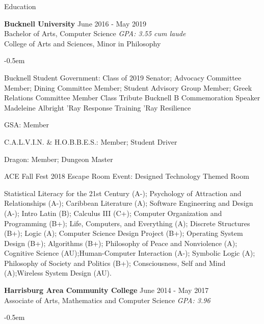\documentclass{resume} %
\begin{document}

\begin{rSection}{Education}

{\bf Bucknell University} {June 2016 - May 2019} 
\\ Bachelor of Arts, Computer Science  {\em GPA: 3.55 cum laude}
\\ College of Arts and Sciences, Minor in Philosophy 
\begin{rSubSection}{}{
   \itemsep -0.5em \vspace{-0.5em} %
 
    \item {Bucknell Student Government:} Class of 2019 Senator; Advocacy Committee Member; Dining Committee Member; Student Advisory Group Member; Greek Relations Committee Member
    \subitem Class Tribute Bucknell B 
    \subitem Commemoration Speaker Madeleine Albright
    \subitem 'Ray Response Training
    \subitem 'Ray Resilience
    \item {GSA:} Member
    \item {C.A.L.V.I.N. \& H.O.B.B.E.S.:} Member; Student Driver
    \item {Dragon:} Member; Dungeon Master
    \item {ACE} 
    \subitem Fall Fest 2018
     Escape Room Event: Designed Technology Themed Room}
    
  \end{rSubSection}
Statistical Literacy for the 21st Century (A-); Psychology of Attraction and Relationships (A-); Caribbean Literature (A); Software Engineering and Design (A-); Intro Latin (B); Calculus III (C+); Computer Organization and Programming (B+); Life, Computers, and Everything (A); Discrete Structures (B+); Logic (A); Computer Science Design Project (B+); Operating System Design (B+); Algorithms (B+); Philosophy of Peace and Nonviolence (A); Cognitive Science (AU);Human-Computer Interaction (A-); Symbolic Logic (A); Philosophy of Society and Politics (B+); Consciousness, Self and Mind (A);Wireless System Design (AU).


{\bf Harrisburg Area Community College} {June 2014 - May 2017} 
\\ Associate of Arts, Mathematics and Computer Science {\em GPA: 3.96}
\begin{rSubSection}{}{
   \itemsep -0.5em \vspace{-0.5em} %
   
}
\end{rSubSection}
\end{rSection}
\end{document}
